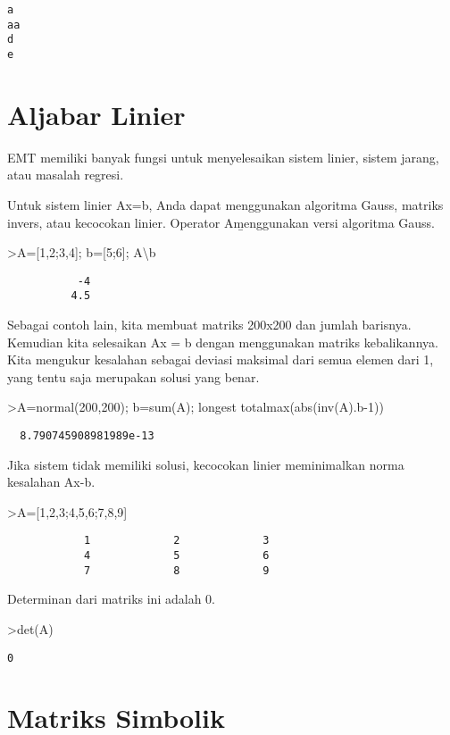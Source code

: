 \documentclass[
]{book}
\begin{document}
\begin{verbatim}
a
aa
d
e
\end{verbatim}

\chapter{Aljabar Linier}\label{aljabar-linier}

EMT memiliki banyak fungsi untuk menyelesaikan sistem linier, sistem jarang, atau masalah regresi.

Untuk sistem linier Ax=b, Anda dapat menggunakan algoritma Gauss, matriks invers, atau kecocokan linier. Operator A\b menggunakan versi algoritma Gauss.

\textgreater A={[}1,2;3,4{]}; b={[}5;6{]}; A\textbackslash b

\begin{verbatim}
           -4 
          4.5 
\end{verbatim}

Sebagai contoh lain, kita membuat matriks 200x200 dan jumlah barisnya. Kemudian kita selesaikan Ax = b dengan menggunakan matriks kebalikannya. Kita mengukur kesalahan sebagai deviasi maksimal dari semua elemen dari 1, yang tentu saja merupakan solusi yang benar.

\textgreater A=normal(200,200); b=sum(A); longest totalmax(abs(inv(A).b-1))

\begin{verbatim}
  8.790745908981989e-13 
\end{verbatim}

Jika sistem tidak memiliki solusi, kecocokan linier meminimalkan norma kesalahan Ax-b.

\textgreater A={[}1,2,3;4,5,6;7,8,9{]}

\begin{verbatim}
            1             2             3 
            4             5             6 
            7             8             9 
\end{verbatim}

Determinan dari matriks ini adalah 0.

\textgreater det(A)

\begin{verbatim}
0
\end{verbatim}

\chapter{Matriks Simbolik}\label{matriks-simbolik}
\end{document}
